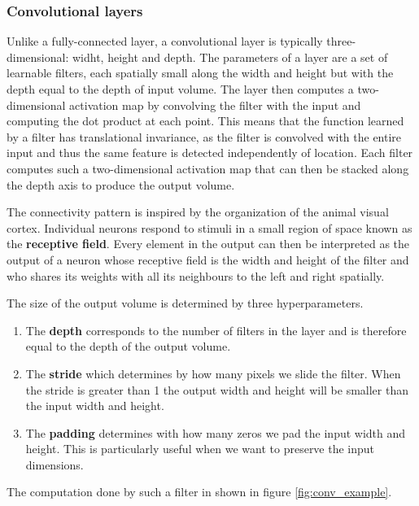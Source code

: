 \documentclass[12pt,a4paper,twoside,openright]{report}
\begin{document}
\subsubsection{Convolutional layers}
Unlike a fully-connected layer, a convolutional layer is typically three-dimensional: widht, height and depth. The parameters of a layer are a set of learnable filters, each spatially small along the width and height but with the depth equal to the depth of input volume. The layer then computes a two-dimensional activation map by convolving the filter with the input and computing the dot product at each point. This means that the function learned by a filter has translational invariance, as the filter is convolved with the entire input and thus the same feature is detected independently of location. Each filter computes such a two-dimensional activation map that can then be stacked along the depth axis to produce the output volume.

The connectivity pattern is inspired by the organization of the animal visual cortex. Individual neurons respond to stimuli in a small region of space known as the \textbf{receptive field}. Every element in the output can then be interpreted as the output of a neuron whose receptive field is the width and height of the filter and who shares its weights with all its neighbours to the left and right spatially.

The size of the output volume is determined by three hyperparameters.
\begin{enumerate}
	\item The \textbf{depth} corresponds to the number of filters in the layer and is therefore equal to the depth of the output volume.
	\item The \textbf{stride} which determines by how many pixels we slide the filter. When the stride is greater than 1 the output width and height will be smaller than the input width and height.
	\item The \textbf{padding} determines with how many zeros we pad the input width and height. This is particularly useful when we want to preserve the input dimensions.
\end{enumerate}
The computation done by such a filter in shown in figure \ref{fig:conv_example}.
\end{document}
